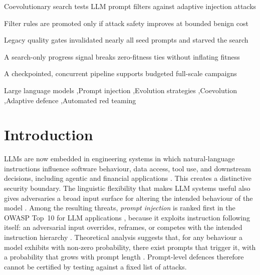 \documentclass[preprint,12pt,authoryear]{elsarticle}
\begin{document}
\begin{frontmatter}
\begin{highlights}
\item Coevolutionary search tests LLM prompt filters against adaptive injection attacks
\item Filter rules are promoted only if attack safety improves at bounded benign cost
\item Legacy quality gates invalidated nearly all seed prompts and starved the search
\item A search-only progress signal breaks zero-fitness ties without inflating fitness
\item A checkpointed, concurrent pipeline supports budgeted full-scale campaigns
\end{highlights}

\begin{keyword}
Large language models \sep Prompt injection \sep Evolution strategies \sep Coevolution \sep Adaptive defence \sep Automated red teaming
\end{keyword}

\end{frontmatter}

\linenumbers

\section{Introduction}
\label{sec:intro}

LLMs are now embedded in engineering systems in which natural-language instructions influence software behaviour, data access, tool use, and downstream decisions, including agentic and financial applications \citep{brohi2025agentic,batra2025finance}. This creates a distinctive security boundary. The linguistic flexibility that makes LLM systems useful also gives adversaries a broad input surface for altering the intended behaviour of the model \citep{kumar2024adversarial,barbera2025privacy}. Among the resulting threats, \emph{prompt injection} is ranked first in the OWASP Top~10 for LLM applications \citep{owasp2025llm01}, because it exploits instruction following itself: an adversarial input overrides, reframes, or competes with the intended instruction hierarchy \citep{liu2024formalizing,gulyamov2026review}. Theoretical analysis suggests that, for any behaviour a model exhibits with non-zero probability, there exist prompts that trigger it, with a probability that grows with prompt length \citep{wolf2023fundamental}. Prompt-level defences therefore cannot be certified by testing against a fixed list of attacks.
\end{document}
